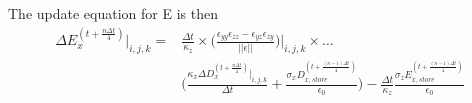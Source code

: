 \documentclass[]{article}
\begin{document}
		The update equation for E is then 
		\begin{align}
			\Delta E_{x}^{(t+\frac{n\Delta t}{4})}|_{i, j, k} = &
			\frac{\Delta t}{\kappa_{z}}\times\bigg(\frac{\epsilon_{yy}\epsilon_{zz} - \epsilon_{yz}\epsilon_{zy}}{||\epsilon||}\bigg)\bigg|_{i, j, k}\times\dots \nonumber \\
			&\bigg(\frac{\kappa_{x}\Delta D_{x}^{(t+\frac{n\Delta t}{4})}|_{i, j, k}}{\Delta t} + \frac{\sigma_{x}D_{x, store}^{(t + \frac{(n-1)\Delta t}{4})}}{\epsilon_{0}}\bigg) - \frac{\Delta t}{\kappa_{z}}\frac{\sigma_{z}E_{x, store}^{(t + \frac{(n-1)\Delta t}{4})}}{\epsilon_{0}}
		\end{align}
\end{document}
